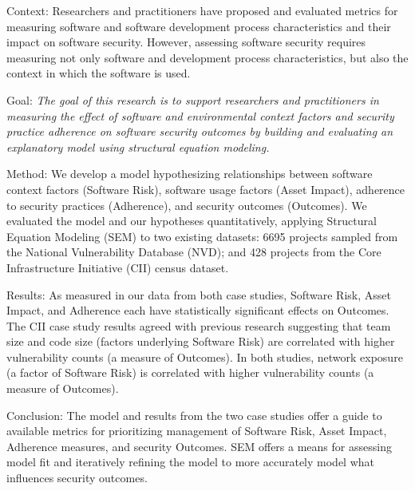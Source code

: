 \label{sec:abstract}
Context: Researchers and practitioners have proposed and evaluated metrics for measuring software and software development process characteristics and their impact on software security. However, assessing software security requires measuring not only software and development process characteristics, but also the context in which the software is used. 

Goal:  \textit{The goal of this research is to support researchers and practitioners in measuring the effect of software and environmental context factors and security practice adherence on software security outcomes by building and evaluating an explanatory model using structural equation modeling.} 

Method: We develop a model hypothesizing relationships between software context factors (Software Risk), software usage factors (Asset Impact), adherence to security practices (Adherence), and security outcomes (Outcomes).  We evaluated the model and our hypotheses quantitatively, applying Structural Equation Modeling (SEM) to two existing datasets: 6695 projects sampled from the National Vulnerability Database (NVD); and 428 projects from the Core Infrastructure Initiative (CII) census dataset.  

Results: As measured in our data from both case studies, Software Risk, Asset Impact, and Adherence each have statistically significant effects on Outcomes. The CII case study results agreed with previous research suggesting that team size and code size (factors underlying Software Risk) are correlated with higher vulnerability counts (a measure of Outcomes). In both studies, network exposure (a factor of Software Risk) is correlated with higher vulnerability counts (a measure of Outcomes).

Conclusion: The model and results from the two case studies offer a guide to available metrics for prioritizing management of Software Risk, Asset Impact, Adherence measures, and security Outcomes. SEM offers a means for assessing model fit and iteratively refining the model to more accurately model what influences security outcomes.